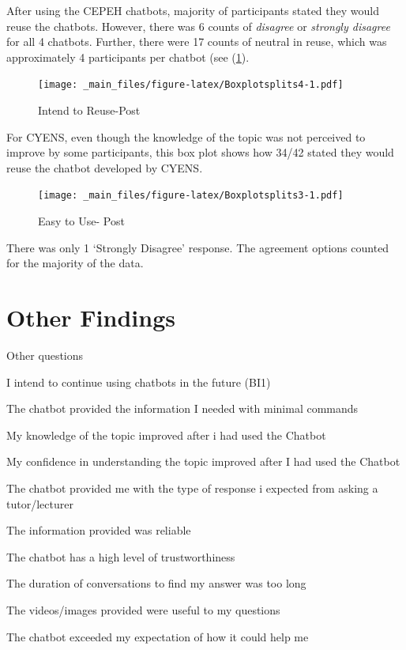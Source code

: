 \documentclass[a4paper, nobind]{templates/ociamthesis}
\begin{document}
After using the CEPEH chatbots, majority of participants stated they
would reuse the chatbots. However, there was 6 counts of \emph{disagree} or
\emph{strongly disagree} for all 4 chatbots. Further, there were 17 counts of
neutral in reuse, which was approximately 4 participants per chatbot
(see (\ref{fig:Boxplotsplits4}).

\begin{figure}
\centering
\texttt{[image: \_main\_files/figure-latex/Boxplotsplits4-1.pdf]}
\caption{\label{fig:Boxplotsplits4}Intend to Reuse-Post}
\end{figure}

For CYENS, even though the knowledge of the topic was not perceived to
improve by some participants, this box plot shows how 34/42 stated they
would reuse the chatbot developed by CYENS.

\begin{figure}
\centering
\texttt{[image: \_main\_files/figure-latex/Boxplotsplits3-1.pdf]}
\caption{\label{fig:Boxplotsplits3}Easy to Use- Post}
\end{figure}

There was only 1 `Strongly Disagree' response. The agreement options
counted for the majority of the data.

\hypertarget{other-findings}{%
\section{Other Findings}\label{other-findings}}

Other questions

I intend to continue using chatbots in the future (BI1)

The chatbot provided the information I needed with minimal commands

My knowledge of the topic improved after i had used the Chatbot

My confidence in understanding the topic improved after I had used the
Chatbot

The chatbot provided me with the type of response i expected from asking
a tutor/lecturer

The information provided was reliable

The chatbot has a high level of trustworthiness

The duration of conversations to find my answer was too long

The videos/images provided were useful to my questions

The chatbot exceeded my expectation of how it could help me
\end{document}
